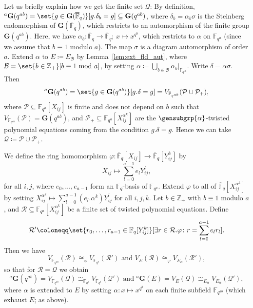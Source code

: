 \documentclass[a4paper,12pt]{amsproc}
\newcommand{\rest}[1]{\left.#1\right\rvert}%
\theoremstyle{plain}
\theoremstyle{definition}
\begin{document}
Let us briefly explain how we get the finite set $\mathcal{Q}$: By definition, ${}^a\mathbf{G}(q^{ab})=\set{g\in\mathbf{G}(\overline{\mathbb{F}}_q)}[g.\delta_b=g]\subseteq\mathbf{G}(q^{ab})$, where $\delta_b=\alpha_b\sigma$ is the Steinberg endomorphism of $\mathbf{G}(\overline{\mathbb{F}}_q)$, which restricts to an automorphism of the finite group $\mathbf{G}(q^{ab})$. Here, we have $\alpha_b\colon \overline{\mathbb{F}}_q\to\overline{\mathbb{F}}_q$; $x\mapsto x^{q^b}$, which restricts to $\alpha$ on $\mathbb{F}_{q^a}$ (since we assume that $b\equiv 1$ modulo $a$). The map $\sigma$ is a diagram automorphism of order $a$. Extend $\alpha$ to $E\coloneqq E_{\mathcal{B}}$ by Lemma~\ref{lem:ext_fld_aut}, where $\mathcal{B}=\set{b\in\mathbb{Z}_+}[b\equiv 1\text{ mod }a]$, by setting $\alpha\coloneqq\bigcup_{b\in\mathcal{B}}{\rest{\alpha_b}_{\mathbb{F}_{q^{ab}}}}$. Write $\delta=\alpha\sigma$. Then 
$$
{}^a\mathbf{G}(q^{ab})=\set{g\in\mathbf{G}(q^{ab})}[g.\delta=g]=V_{\mathbb{F}_{q^{ab}}}(\mathcal{P}\cup\mathcal{P}_+),
$$
where $\mathcal{P}\subseteq\mathbb{F}_{q^a}[X_{ij}]$ is finite and does not depend on $b$ such that $V_{\mathbb{F}_{q^{ab}}}(\mathcal{P})=\mathbf{G}(q^{ab})$, and $\mathcal{P}_+\subseteq\mathbb{F}_{q^a}[X_{ij}^{\alpha^k}]$ are the $\gensubgrp{\alpha}$-twisted polynomial equations coming from the condition $g.\delta=g$. Hence we can take $\mathcal{Q}\coloneqq\mathcal{P}\cup\mathcal{P}_+$.
	
We define the ring homomorphism $\varphi\colon\overline{\mathbb{F}}_q[X_{ij}]\to\overline{\mathbb{F}}_q[Y_{ij}^k]$ by
$$
X_{ij}\mapsto\sum_{l=0}^{a-1}e_l Y_{ij}^l,
$$
for all $i,j$, where $e_0,\ldots,e_{a-1}$ form an $\mathbb{F}_q$-basis of $\mathbb{F}_{q^a}$. Extend $\varphi$ to all of $\overline{\mathbb{F}}_q[X_{ij}^{\alpha^k}]$ by setting $X_{ij}^{\alpha^k}\mapsto\sum_{l=0}^{a-1}(e_l.\alpha^k) Y_{ij}^l$ for all $i,j,k$. Let $b\in\mathbb{Z}_+$ with $b\equiv 1$ modulo $a$, and $\mathcal{R}\subseteq\mathbb{F}_{q^a}[X_{ij}^{\alpha^k}]$ be a finite set of twisted polynomial equations. Define 
$$
\mathcal{R}'\coloneqq\set{r_0,\ldots,r_{a-1}\in\mathbb{F}_q[Y_{ij}^k]}[\exists r\in\mathcal{R}.\varphi\colon r=\sum_{l=0}^{a-1}{e_lr_l}].
$$ 	
Then we have
\begin{equation}\label{eq:var_corresp}
V_{\mathbb{F}_{q^{ab}}}(\mathcal{R})\cong_\varphi V_{\mathbb{F}_{q^b}}(\mathcal{R}')\text{ and }
V_E(\mathcal{R})\cong_\varphi V_{E_\alpha}(\mathcal{R}'),
\end{equation}
so that for $\mathcal{R}=\mathcal{Q}$ we obtain
\begin{equation}\label{eq:vars}
{}^a\mathbf{G}(q^{ab})=V_{\mathbb{F}_{q^{ab}}}(\mathcal{Q})\cong_{\mathbb{F}_{q^b}} V_{\mathbb{F}_{q^b}}(\mathcal{Q}') \text{ and }
{}^a\mathbf{G}(E)=V_E(\mathcal{Q})\cong_{E_\alpha} V_{E_\alpha}(\mathcal{Q}'),
\end{equation}
where $\alpha$ is extended to $E$ by setting $\alpha\colon x\mapsto x^{q^b}$ on each finite subfield  $\mathbb{F}_{q^{ab}}$ (which exhaust $E$; as above).
	
\end{document}
